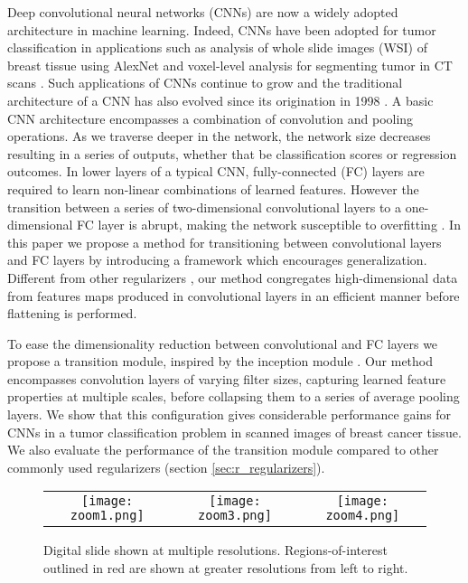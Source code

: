 \documentclass[runningheads,a4paper]{llncs}
\begin{document}
Deep convolutional neural networks (CNNs) are now a widely adopted architecture in machine learning. Indeed, CNNs have been adopted for tumor classification in applications such as analysis of whole slide images (WSI) of breast tissue using AlexNet \cite{Spanhol2016} and voxel-level analysis for segmenting tumor in CT scans \cite{Vivanti2015}. Such applications of CNNs continue to grow and the traditional architecture of a CNN has also evolved since its origination in 1998 \cite{LeCun1998}. A basic CNN architecture encompasses a combination of convolution and pooling operations. As we traverse deeper in the network, the network size decreases resulting in a series of outputs, whether that be classification scores or regression outcomes. In lower layers of a typical CNN, fully-connected (FC) layers are required to learn non-linear combinations of learned features. However the transition between a series of two-dimensional convolutional layers to a one-dimensional FC layer is abrupt, making the network susceptible to overfitting \cite{Lin2014}. In this paper we propose a method for transitioning between convolutional layers and FC layers by introducing a framework which encourages generalization. Different from other regularizers \cite{Srivastava2014,Krizhevsky2012}, our method congregates high-dimensional data from features maps produced in convolutional layers in an efficient manner before flattening is performed.

To ease the dimensionality reduction between convolutional and FC layers we propose a transition module, inspired by the inception module \cite{Szegedy2015}. Our method encompasses convolution layers of varying filter sizes, capturing learned feature properties at multiple scales, before collapsing them to a series of average pooling layers. We show that this configuration gives considerable performance gains for CNNs in a tumor classification problem in scanned images of breast cancer tissue. We also evaluate the performance of the transition module compared to other commonly used regularizers (section \ref{sec:r_regularizers}).

\begin{figure}[t]
	\centering
	\begin{tabular}{ccc}{\texttt{[image: zoom1.png]}} &
		{\texttt{[image: zoom3.png]}} &
		{\texttt{[image: zoom4.png]}} \\
	\end{tabular}
	\caption{Digital slide shown at multiple resolutions. Regions-of-interest outlined in red are shown at greater resolutions from left to right.}
	\label{fig:multi}
\end{figure}
\end{document}
